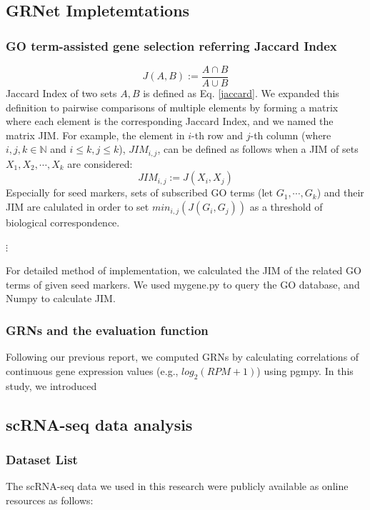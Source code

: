 \documentclass{article}
\begin{document}
\subsection*{GRNet Impletemtations}

\subsubsection*{GO term-assisted gene selection referring Jaccard Index}
\begin{equation}\label{jaccard}
  J(A, B) := \frac{A\cap B}{A\cup B}
\end{equation}
Jaccard Index of two sets $A, B$ is defined as Eq. \eqref{jaccard}. We expanded this 
definition to pairwise comparisons of multiple elements by forming a matrix 
where each element is the corresponding Jaccard Index, and we named the matrix \ac{JIM}. For example, the element in 
$i$-th row and $j$-th column (where $i, j, k\in\mathbb{N}$ and $i\leq k, j\leq k$), $JIM_{i,j}$, can be defined as
follows when a JIM of sets $X_1, X_2,\cdots, X_k$ are considered:
\begin{equation}\label{jim}
  JIM_{i, j} := J(X_i, X_j)
\end{equation}
Especially for seed markers, sets of subscribed GO terms (let $G_1, \cdots, G_k$)
and their JIM are calulated in order to set $min_{i,j}(J(G_i, G_j))$ as a threshold of 
biological correspondence.

$\vdots$

For detailed method of implementation, we calculated the JIM of the related GO terms of given seed markers. We used mygene.py\cite{mygene} to query the GO database, and Numpy\cite{numpy} to calculate JIM.

\subsubsection*{GRNs and the evaluation function}
Following our previous report\cite{okano2023set}, we computed GRNs by calculating
correlations of continuous gene expression values (e.g., $log_2(RPM+1)$) using pgmpy. In this study, we introduced

\subsection*{scRNA-seq data analysis}
\subsubsection*{Dataset List}
The scRNA-seq data we used in this research were publicly available as online
resources as follows:
\end{document}
